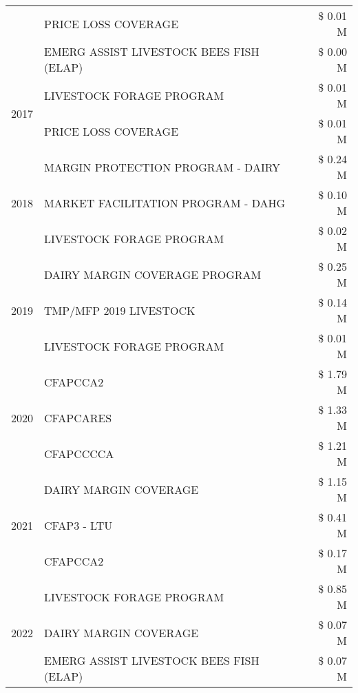 \begin{tabular}{llr}
 & PRICE LOSS COVERAGE & \$ 0.01 M \\
 & EMERG ASSIST LIVESTOCK BEES FISH (ELAP) & \$ 0.00 M \\
\cline{1-3}
\multirow[t]{2}{*}{2017} & LIVESTOCK FORAGE PROGRAM & \$ 0.01 M \\
 & PRICE LOSS COVERAGE & \$ 0.01 M \\
\cline{1-3}
\multirow[t]{3}{*}{2018} & MARGIN PROTECTION PROGRAM - DAIRY & \$ 0.24 M \\
 & MARKET FACILITATION PROGRAM - DAHG & \$ 0.10 M \\
 & LIVESTOCK FORAGE PROGRAM & \$ 0.02 M \\
\cline{1-3}
\multirow[t]{3}{*}{2019} & DAIRY MARGIN COVERAGE PROGRAM & \$ 0.25 M \\
 & TMP/MFP 2019 LIVESTOCK & \$ 0.14 M \\
 & LIVESTOCK FORAGE PROGRAM & \$ 0.01 M \\
\cline{1-3}
\multirow[t]{3}{*}{2020} & CFAPCCA2 & \$ 1.79 M \\
 & CFAPCARES & \$ 1.33 M \\
 & CFAPCCCCA & \$ 1.21 M \\
\cline{1-3}
\multirow[t]{3}{*}{2021} & DAIRY MARGIN COVERAGE & \$ 1.15 M \\
 & CFAP3 - LTU & \$ 0.41 M \\
 & CFAPCCA2 & \$ 0.17 M \\
\cline{1-3}
\multirow[t]{3}{*}{2022} & LIVESTOCK FORAGE PROGRAM & \$ 0.85 M \\
 & DAIRY MARGIN COVERAGE & \$ 0.07 M \\
 & EMERG ASSIST LIVESTOCK BEES FISH (ELAP) & \$ 0.07 M \\
\cline{1-3}
\bottomrule
\end{tabular}
